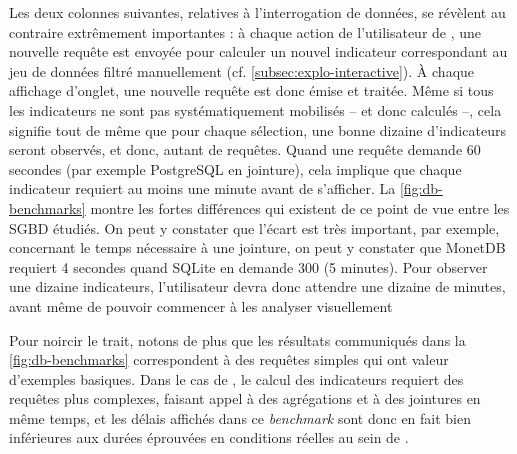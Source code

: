 Les deux colonnes suivantes, relatives à l'interrogation de données, se révèlent au contraire extrêmement importantes : à chaque action de l'utilisateur de \simedb{}, une nouvelle requête est envoyée pour calculer un nouvel indicateur correspondant au jeu de données filtré manuellement (cf. \cref{subsec:explo-interactive}).
À chaque affichage d'onglet, une nouvelle requête est donc émise et traitée.
Même si tous les indicateurs ne sont pas systématiquement mobilisés -- et donc calculés --, cela signifie tout de même que pour chaque sélection, une bonne dizaine d'indicateurs seront observés, et donc, autant de requêtes.
Quand une requête demande 60 secondes (par exemple PostgreSQL en \og jointure\fg{}), cela implique que chaque indicateur requiert au moins une minute avant de s'afficher.
La \cref{fig:db-benchmarks} montre les fortes différences qui existent de ce point de vue entre les SGBD étudiés.
On peut y constater que l'écart est très important, par exemple, concernant le temps nécessaire à une jointure, on peut y constater que MonetDB requiert 4 secondes quand SQLite en demande 300 (5 minutes).
Pour observer une dizaine indicateurs, l'utilisateur devra donc attendre une dizaine de minutes, avant même de pouvoir commencer à les analyser visuellement

Pour noircir le trait, notons de plus que les résultats communiqués dans la \cref{fig:db-benchmarks} correspondent à des requêtes simples qui ont valeur d'exemples basiques.
Dans le cas de \simedb{}, le calcul des indicateurs requiert des requêtes plus complexes, faisant appel à des agrégations et à des jointures en même temps, et les délais affichés dans ce \textit{benchmark} sont donc en fait bien inférieures aux durées éprouvées en conditions réelles au sein de \simedb{}.

